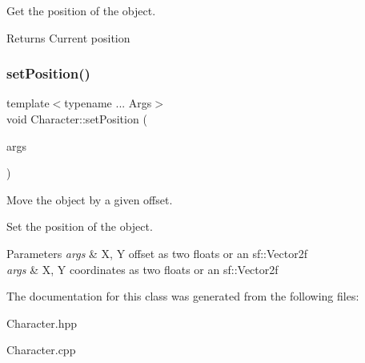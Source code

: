 Get the position of the object. 

\begin{DoxyReturn}{Returns}
Current position 
\end{DoxyReturn}
\mbox{\label{class_character_aeeced2dfcc027de98e223b4561760fa5}} 
\subsubsection{\texorpdfstring{set\+Position()}{setPosition()}}
{\footnotesize\ttfamily template$<$typename ... Args$>$ \\
void Character\+::set\+Position (\begin{DoxyParamCaption}\item[{Args \&\&...}]{args }\end{DoxyParamCaption})\hspace{0.3cm}{\ttfamily [inline]}}



Move the object by a given offset. 

Set the position of the object.


\begin{DoxyParams}{Parameters}
{\em args} & X, Y offset as two floats or an sf\+::\+Vector2f\\
\hline
{\em args} & X, Y coordinates as two floats or an sf\+::\+Vector2f \\
\hline
\end{DoxyParams}


The documentation for this class was generated from the following files\+:\begin{DoxyCompactItemize}
\item 
Character.\+hpp\item 
Character.\+cpp\end{DoxyCompactItemize}
